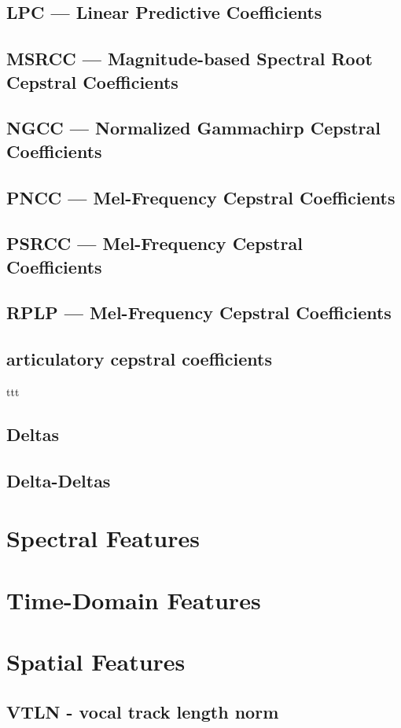 \subsection{LPC --- Linear Predictive Coefficients}
\subsection{MSRCC --- Magnitude-based Spectral Root Cepstral Coefficients}
\subsection{NGCC --- Normalized Gammachirp Cepstral Coefficients}
\subsection{PNCC --- Mel-Frequency Cepstral Coefficients}
\subsection{PSRCC --- Mel-Frequency Cepstral Coefficients}
\subsection{RPLP --- Mel-Frequency Cepstral Coefficients}
\subsection{articulatory cepstral coefficients}
ttt

\subsection{Deltas}
\subsection{Delta-Deltas}

\section{Spectral Features}

\section{Time-Domain Features}

\section{Spatial Features}
\subsection{VTLN - vocal track length norm}

